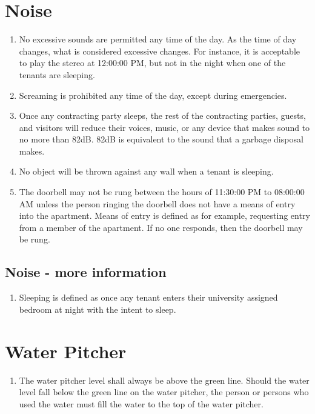 \documentclass[10pt]{article}
\begin{document}
\section{Noise}
\begin{enumerate}
	\item No excessive sounds are permitted any time of the day. As the time of day changes, what is considered excessive changes. For instance, it is acceptable to play the stereo at 12:00:00 PM, but not in the night when one of the tenants are sleeping.
	\item Screaming is prohibited any time of the day, except during emergencies.
	\item Once any contracting party sleeps, the rest of the contracting parties, guests, and visitors will reduce their voices, music, or any device that makes sound to no more than 82dB. 82dB is equivalent to the sound that a garbage disposal makes.
	\item No object will be thrown against any wall when a tenant is sleeping.
	\item The doorbell may not be rung between the hours of 11:30:00 PM to 08:00:00 AM unless the person ringing the doorbell does not have a means of entry into the apartment.
	\subitem Means of entry is defined as for example, requesting entry from a member of the apartment. If no one responds, then the doorbell may be rung.
	
\end{enumerate}
\subsection{Noise - more information}
\begin{enumerate}
	\item Sleeping is defined as once any tenant enters their university assigned bedroom at night with the intent to sleep.
\end{enumerate}
\section{Water Pitcher}
\begin{enumerate}
	\item The water pitcher level shall always be above the green line. Should the water level fall below the green line on the water pitcher, the person or persons who used the water must fill the water to the top of the water pitcher.
\end{enumerate}
\end{document}

